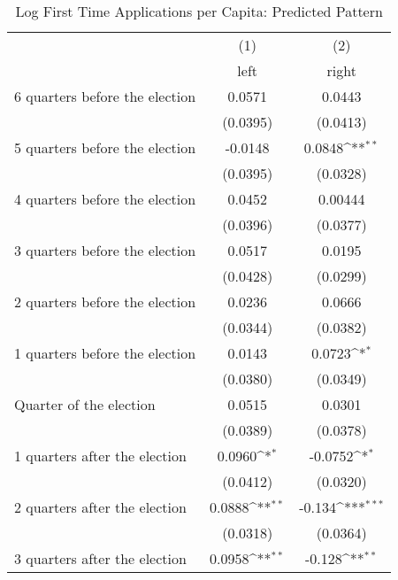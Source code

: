 \begin{table}[htbp]\centering
\def\sym#1{\ifmmode^{#1}\else\(^{#1}\)\fi}
\caption{Log First Time Applications per Capita: Predicted Pattern}
\begin{tabular}{l*{2}{c}}
\hline\hline
                    &\multicolumn{1}{c}{(1)}&\multicolumn{1}{c}{(2)}\\
                    &\multicolumn{1}{c}{left}&\multicolumn{1}{c}{right}\\
\hline
 6 quarters before the election&      0.0571         &      0.0443         \\
                    &    (0.0395)         &    (0.0413)         \\
[1em]
 5 quarters before the election&     -0.0148         &      0.0848\sym{**} \\
                    &    (0.0395)         &    (0.0328)         \\
[1em]
 4 quarters before the election&      0.0452         &     0.00444         \\
                    &    (0.0396)         &    (0.0377)         \\
[1em]
 3 quarters before the election&      0.0517         &      0.0195         \\
                    &    (0.0428)         &    (0.0299)         \\
[1em]
 2 quarters before the election&      0.0236         &      0.0666         \\
                    &    (0.0344)         &    (0.0382)         \\
[1em]
 1 quarters before the election&      0.0143         &      0.0723\sym{*}  \\
                    &    (0.0380)         &    (0.0349)         \\
[1em]
Quarter of the election&      0.0515         &      0.0301         \\
                    &    (0.0389)         &    (0.0378)         \\
[1em]
 1 quarters after the election&      0.0960\sym{*}  &     -0.0752\sym{*}  \\
                    &    (0.0412)         &    (0.0320)         \\
[1em]
 2 quarters after the election&      0.0888\sym{**} &      -0.134\sym{***}\\
                    &    (0.0318)         &    (0.0364)         \\
[1em]
 3 quarters after the election&      0.0958\sym{**} &      -0.128\sym{**} \\

\end{tabular}
\end{table}
